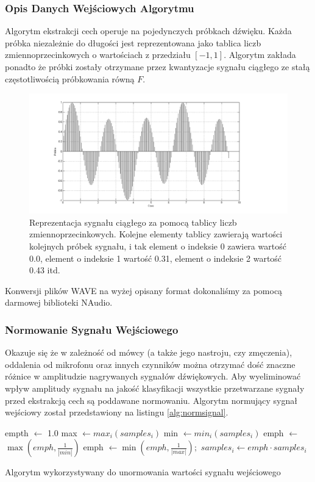 \documentclass[a4paper]{article}
\begin{document}
		\subsubsection*{Opis Danych Wejściowych Algorytmu}
		Algorytm ekstrakcji cech operuje na pojedynczych próbkach dźwięku.
		Każda próbka niezależnie do długości jest reprezentowana jako 
		tablica liczb zmiennoprzecinkowych o wartościach z przedziału $[-1, 1]$.
		Algorytm zakłada ponadto że próbki zostały otrzymane przez kwantyzacje
		sygnału ciągłego ze stałą częstotliwością próbkowania równą $F$.
		\begin{figure}[h]
			\centering
			\includegraphics[width=\textwidth,trim= 3cm 0cm 6cm 0cm, clip]{./img/mfcc_wave}
			\caption{Reprezentacja sygnału ciągłego za pomocą tablicy liczb zmiennoprzecinkowych.
			Kolejne elementy tablicy zawierają wartości kolejnych próbek sygnału, i tak element o
			indeksie 0 zawiera wartość 0.0, element o indeksie 1 wartość 0.31,
			element o indeksie 2 wartość 0.43 itd.}
			\label{fig:sndwave}
		\end{figure}
		Konwersji plików WAVE na wyżej opisany format dokonaliśmy za pomocą darmowej biblioteki
		NAudio.
		
		\subsubsection*{Normowanie Sygnału Wejściowego}
		Okazuje się że w zależność od mówcy (a także jego nastroju, czy zmęczenia), oddalenia od mikrofonu
		oraz innych czynników można otrzymać dość znaczne różnice w amplitudzie nagrywanych sygnałów
		dźwiękowych. Aby wyeliminować wpływ amplitudy sygnału na jakość klasyfikacji wszystkie przetwarzane
		sygnały przed ekstrakcją cech są poddawane normowaniu. 
		Algorytm normujący sygnał wejściowy został przedstawiony
		na listingu \ref{alg:normsignal}. 
		\begin{algorithm}[h]
			\begin{algorithmic}[1]
				\STATE {}
				\STATE empth $\leftarrow$ 1.0
				\STATE max $\leftarrow max_i(samples_i)$
				\STATE min $\leftarrow min_i(samples_i)$
				\STATE
					\STATE emph $\leftarrow$ $\max(emph, \frac{1}{|min|})$
				\ENDIF
					\STATE emph $\leftarrow \min(emph, \frac{1}{|max|});$
				\ENDIF
				\STATE
					\STATE $samples_i \leftarrow emph \cdot samples_i$
				\ENDFOR
			\end{algorithmic}			
			\caption{Algorytm wykorzystywany do unormowania wartości sygnału wejściowego}
			\label{alg:normsignal}
		\end{algorithm}
		
\end{document}

